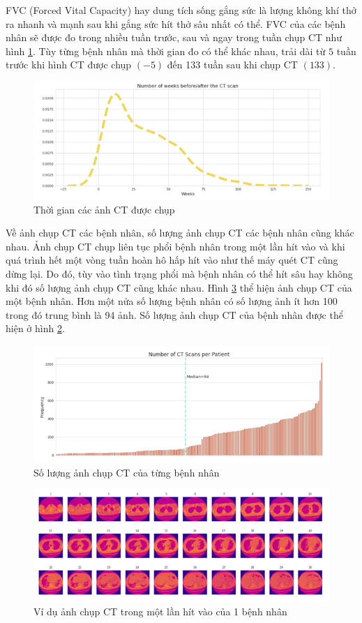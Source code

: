 FVC (Forced Vital Capacity) hay dung tích sống gắng sức là lượng không khí thở ra nhanh và mạnh sau khi gắng sức hít thở sâu nhất có thể. FVC của các bệnh nhân sẽ được đo trong nhiều tuần trước, sau và ngay trong tuần chụp CT như hình \ref{fig:data2}. Tùy từng bệnh nhân mà thời gian đo có thể khác nhau, trải dài từ $5$ tuần trước khi hình CT được chụp $(-5)$ đến 133 tuần sau khi chụp CT $(133)$.\par
\begin{figure}[ht!]
\centerline{\includegraphics[scale=0.8]{images/data2.png}}
\caption{Thờì gian các ảnh CT được chụp}
\label{fig:data2}
\end{figure}
Về ảnh chụp CT các bệnh nhân, số lượng ảnh chụp CT các bệnh nhân cũng khác nhau. Ảnh chụp CT chụp liên tục phổi bệnh nhân trong một lần hít vào và khi quá trình hết một vòng tuần hoàn hô hấp hít vào như thế máy quét CT cũng dừng lại. Do đó, tùy vào tình trạng phổi mà bệnh nhân có thể hít sâu hay không khi đó số lượng ảnh chụp CT cũng khác nhau. Hình \ref{fig:data4} thể hiện ảnh chụp CT của một bệnh nhân. Hơn một nửa số lượng bệnh nhân có số lượng ảnh ít hơn 100 trong đó trung bình là 94 ảnh. Số lượng ảnh chụp CT của bệnh nhân được thể hiện ở hình \ref{fig:data3}.\par
\begin{figure}[ht!]
\centerline{\includegraphics[scale=0.7]{images/data3.png}}
\caption{Số lượng ảnh chụp CT của từng bệnh nhân}
\label{fig:data3}
\end{figure}
\begin{figure}[ht!]
\centerline{\includegraphics[scale=0.7]{images/data4.png}}
\caption{Ví dụ ảnh chụp CT trong một lần hít vào của 1 bệnh nhân}
\label{fig:data4}
\end{figure}
